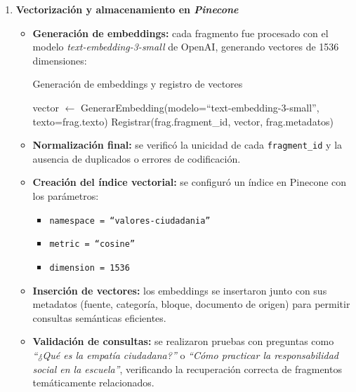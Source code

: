 \begin{enumerate}
      \item \textbf{Vectorización y almacenamiento en \textit{Pinecone}}
            \begin{itemize}
                  \item \textbf{Generación de embeddings:} cada fragmento fue procesado con el modelo \textit{text-embedding-3-small} de OpenAI, generando vectores de 1536 dimensiones:

                        \begin{algorithm}[H]
                              \caption{Generación de embeddings y registro de vectores}
                              \label{alg:vectorizar-fragmentos}
                              \begin{algorithmic}[1]
                                    \State vector $\gets$ GenerarEmbedding(modelo=``text-embedding-3-small'', texto=frag.texto)
                                    \State Registrar(frag.fragment\_id, vector, frag.metadatos)
                                    \EndFor
                                    \EndProcedure
                              \end{algorithmic}
                        \end{algorithm}

                  \item \textbf{Normalización final:} se verificó la unicidad de cada \texttt{fragment\_id} y la ausencia de duplicados o errores de codificación.
                  \item \textbf{Creación del índice vectorial:} se configuró un índice en Pinecone con los parámetros:
                        \begin{itemize}
                              \item \texttt{namespace = ``valores-ciudadania''}
                              \item \texttt{metric = ``cosine''}
                              \item \texttt{dimension = 1536}
                        \end{itemize}
                  \item \textbf{Inserción de vectores:} los embeddings se insertaron junto con sus metadatos (fuente, categoría, bloque, documento de origen) para permitir consultas semánticas eficientes.
                  \item \textbf{Validación de consultas:} se realizaron pruebas con preguntas como
                        \textit{“¿Qué es la empatía ciudadana?”} o
                        \textit{“Cómo practicar la responsabilidad social en la escuela”},
                        verificando la recuperación correcta de fragmentos temáticamente relacionados.
            \end{itemize}
\end{enumerate}

